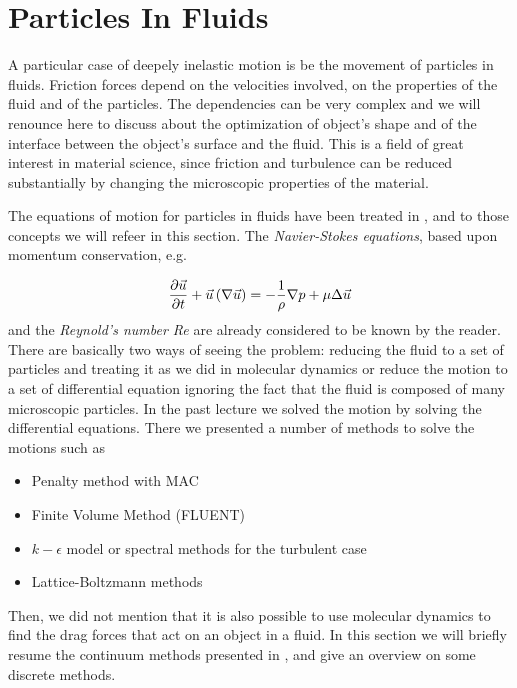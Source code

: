 



\section{Particles In Fluids}






A particular case of deepely inelastic motion is be the movement of particles in fluids. Friction forces depend on the velocities involved, on the properties of the fluid and of the particles. The dependencies can be very complex and we will renounce here to discuss about the optimization of object's shape and of the interface between the object's surface and the fluid. This is a field of great interest in material science, since friction and turbulence can be reduced substantially by changing the microscopic properties of the material. 


The equations of motion for particles in fluids have been treated in \citet{comp_phys}, and to those concepts we will refeer in this section. The \emph{Navier-Stokes equations}, based upon momentum conservation,  e.g.

\begin{equation}
\frac{\partial \vec{u}}{\partial t} + \vec{u}\left(\nabla \vec{u}\right) = - \frac{1}{\rho} \nabla p + \mu \Delta\vec{u}
\label{eq:nseq}
\end{equation}
and the \emph{Reynold's number Re} are already considered to be known by the reader.  There are basically two ways of seeing the problem: reducing the fluid to a set of particles and treating it as we did in molecular dynamics or reduce the motion to a set of differential equation ignoring the fact that the fluid is composed of many microscopic particles. In the past lecture we solved the motion by solving the differential equations. There we presented a number of methods to solve the motions such as
\begin{itemize}
\item Penalty method with MAC
\item Finite Volume Method (FLUENT)
\item $k-\epsilon$ model or spectral methods for the turbulent case
\item Lattice-Boltzmann methods
\end{itemize}
Then, we did not mention that it is also possible to use molecular dynamics to find the drag forces that act on an object in a fluid. In this section we will briefly resume the continuum methods presented in \citet{comp_phys}, and give an overview on some discrete methods.



